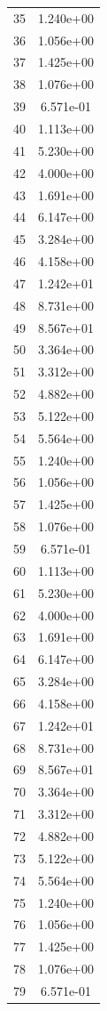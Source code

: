 \documentclass[12pt]{article}
\begin{document}
\begin{longtable}{@{}cc@{}}
35 & 1.240e+00 \\
36 & 1.056e+00 \\
37 & 1.425e+00 \\
38 & 1.076e+00 \\
39 & 6.571e-01 \\
40 & 1.113e+00 \\
41 & 5.230e+00 \\
42 & 4.000e+00 \\
43 & 1.691e+00 \\
44 & 6.147e+00 \\
45 & 3.284e+00 \\
46 & 4.158e+00 \\
47 & 1.242e+01 \\
48 & 8.731e+00 \\
49 & 8.567e+01 \\
50 & 3.364e+00 \\
51 & 3.312e+00 \\
52 & 4.882e+00 \\
53 & 5.122e+00 \\
54 & 5.564e+00 \\
55 & 1.240e+00 \\
56 & 1.056e+00 \\
57 & 1.425e+00 \\
58 & 1.076e+00 \\
59 & 6.571e-01 \\
60 & 1.113e+00 \\
61 & 5.230e+00 \\
62 & 4.000e+00 \\
63 & 1.691e+00 \\
64 & 6.147e+00 \\
65 & 3.284e+00 \\
66 & 4.158e+00 \\
67 & 1.242e+01 \\
68 & 8.731e+00 \\
69 & 8.567e+01 \\
70 & 3.364e+00 \\
71 & 3.312e+00 \\
72 & 4.882e+00 \\
73 & 5.122e+00 \\
74 & 5.564e+00 \\
75 & 1.240e+00 \\
76 & 1.056e+00 \\
77 & 1.425e+00 \\
78 & 1.076e+00 \\
79 & 6.571e-01 \\

\end{longtable}
\end{document}

